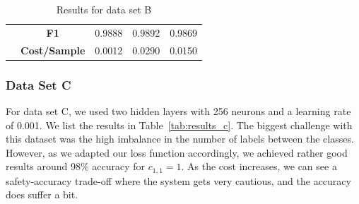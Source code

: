 \documentclass[acmsmall,nonacm]{acmart}
\begin{document}
\begin{table}[H]
{\begin{tabular}{cccllcllccc}
  \multicolumn{1}{|l|}{} & \multicolumn{1}{c|}{\textbf{F1}} & \multicolumn{3}{c|}{0.9888} & \multicolumn{3}{c|}{0.9892} & \multicolumn{3}{c|}{0.9869} \\ \cline{2-11} 
  \multicolumn{1}{|l|}{} & \multicolumn{1}{l|}{\textbf{Cost/Sample}} & \multicolumn{3}{c|}{0.0012} & \multicolumn{3}{c|}{0.0290} & \multicolumn{3}{c|}{0.0150} \\ \hline
  \end{tabular}}
  \caption{Results for data set B}
  \label{tab:results_b}
  \end{table}

\subsubsection*{Data Set C}
For data set C, we used two hidden layers with 256 neurons and a learning rate of 0.001. We list the results in Table~\ref{tab:results_c}. The biggest challenge with this dataset was the high imbalance in the number of labels between the classes. However, as we adapted our loss function accordingly, we achieved rather good results around 98\% accuracy for $c_{1, 1} = 1$. As the cost increases, we can see a safety-accuracy trade-off where the system gets very cautious, and the accuracy does suffer a bit.
\end{document}
